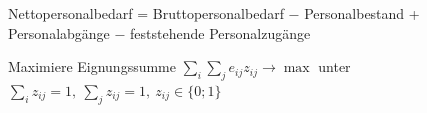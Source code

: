 
Nettopersonalbedarf = Bruttopersonalbedarf $-$ Personalbestand + Personalabgänge $-$ feststehende Personalzugänge

 Maximiere Eignungssumme $\sum_{i}\sum_{j} e_{ij} z_{ij} \to \max$ unter $\sum_i z_{ij}=1,\ \sum_j z_{ij}=1,\ z_{ij}\in\{0;1\}$
